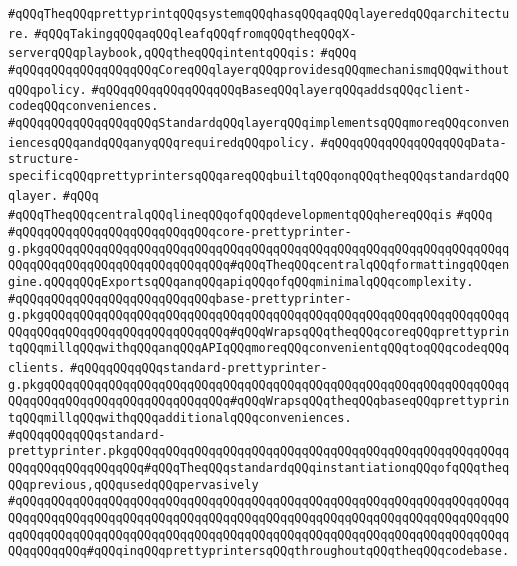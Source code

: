 \verb|#qQQqTheqQQqprettyprintqQQqsystemqQQqhasqQQqaqQQqlayeredqQQqarchitecture.|\newline
\verb|#qQQqTakingqQQqaqQQqleafqQQqfromqQQqtheqQQqX-serverqQQqplaybook,qQQqtheqQQqintentqQQqis:|\newline
\verb|#qQQq|\newline
\verb|#qQQqqQQqqQQqqQQqqQQqCoreqQQqlayerqQQqprovidesqQQqmechanismqQQqwithoutqQQqpolicy.|\newline
\verb|#qQQqqQQqqQQqqQQqqQQqBaseqQQqlayerqQQqaddsqQQqclient-codeqQQqconveniences.|\newline
\verb|#qQQqqQQqqQQqqQQqqQQqStandardqQQqlayerqQQqimplementsqQQqmoreqQQqconveniencesqQQqandqQQqanyqQQqrequiredqQQqpolicy.|\newline
\verb|#qQQqqQQqqQQqqQQqqQQqData-structure-specificqQQqprettyprintersqQQqareqQQqbuiltqQQqonqQQqtheqQQqstandardqQQqlayer.|\newline
\verb|#qQQq|\newline
\verb|#qQQqTheqQQqcentralqQQqlineqQQqofqQQqdevelopmentqQQqhereqQQqis|\newline
\verb|#qQQq|\newline
\verb|#qQQqqQQqqQQqqQQqqQQqqQQqqQQqcore-prettyprinter-g.pkgqQQqqQQqqQQqqQQqqQQqqQQqqQQqqQQqqQQqqQQqqQQqqQQqqQQqqQQqqQQqqQQqqQQqqQQqqQQqqQQqqQQqqQQqqQQqqQQq#qQQqTheqQQqcentralqQQqformattingqQQqengine.qQQqqQQqExportsqQQqanqQQqapiqQQqofqQQqminimalqQQqcomplexity.|\newline
\verb|#qQQqqQQqqQQqqQQqqQQqqQQqqQQqbase-prettyprinter-g.pkgqQQqqQQqqQQqqQQqqQQqqQQqqQQqqQQqqQQqqQQqqQQqqQQqqQQqqQQqqQQqqQQqqQQqqQQqqQQqqQQqqQQqqQQqqQQqqQQq#qQQqWrapsqQQqtheqQQqcoreqQQqprettyprintqQQqmillqQQqwithqQQqanqQQqAPIqQQqmoreqQQqconvenientqQQqtoqQQqcodeqQQqclients.|\newline
\verb|#qQQqqQQqqQQqstandard-prettyprinter-g.pkgqQQqqQQqqQQqqQQqqQQqqQQqqQQqqQQqqQQqqQQqqQQqqQQqqQQqqQQqqQQqqQQqqQQqqQQqqQQqqQQqqQQqqQQqqQQqqQQq#qQQqWrapsqQQqtheqQQqbaseqQQqprettyprintqQQqmillqQQqwithqQQqadditionalqQQqconveniences.|\newline
\verb|#qQQqqQQqqQQqstandard-prettyprinter.pkgqQQqqQQqqQQqqQQqqQQqqQQqqQQqqQQqqQQqqQQqqQQqqQQqqQQqqQQqqQQqqQQqqQQqqQQq#qQQqTheqQQqstandardqQQqinstantiationqQQqofqQQqtheqQQqprevious,qQQqusedqQQqpervasively|\newline
\verb|#qQQqqQQqqQQqqQQqqQQqqQQqqQQqqQQqqQQqqQQqqQQqqQQqqQQqqQQqqQQqqQQqqQQqqQQqqQQqqQQqqQQqqQQqqQQqqQQqqQQqqQQqqQQqqQQqqQQqqQQqqQQqqQQqqQQqqQQqqQQqqQQqqQQqqQQqqQQqqQQqqQQqqQQqqQQqqQQqqQQqqQQqqQQqqQQqqQQqqQQqqQQqqQQqqQQqqQQqqQQq#qQQqinqQQqprettyprintersqQQqthroughoutqQQqtheqQQqcodebase.|\newline
